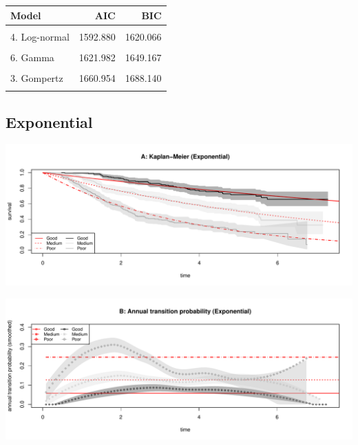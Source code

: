 \documentclass[]{article}
\begin{document}
\begin{table}[H]
\centering
\begin{tabular}{lrr}
\toprule
Model & AIC & BIC\\
\midrule
\cellcolor{gray!6}{7. Generalised Gamma} & \cellcolor{gray!6}{1589.049} & \cellcolor{gray!6}{1629.826}\\
4. Log-normal & 1592.880 & 1620.066\\
\cellcolor{gray!6}{5. Log-logistic} & \cellcolor{gray!6}{1609.294} & \cellcolor{gray!6}{1636.479}\\
6. Gamma & 1621.982 & 1649.167\\
\cellcolor{gray!6}{2. Weibull} & \cellcolor{gray!6}{1632.618} & \cellcolor{gray!6}{1659.803}\\
3. Gompertz & 1660.954 & 1688.140\\
\cellcolor{gray!6}{1. Exponential} & \cellcolor{gray!6}{1668.212} & \cellcolor{gray!6}{1681.805}\\
\bottomrule
\end{tabular}
\end{table}

\newpage

\subsection{Exponential}\label{exponential}

\begin{flushleft}\includegraphics[height=0.25\textheight]{Images/expo-1} \end{flushleft}

\begin{flushleft}\includegraphics[height=0.25\textheight]{Images/expo-2} \end{flushleft}
\end{document}
